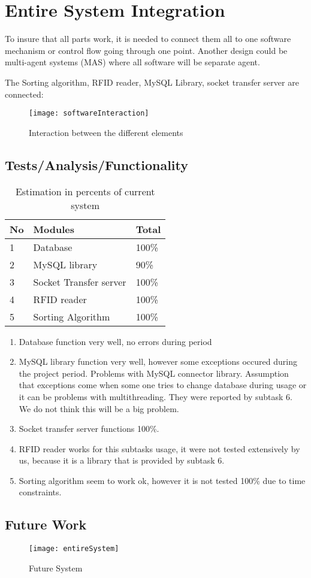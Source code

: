 %
\section{Entire System Integration}

To insure that all parts work, it is needed to connect them all to one software mechanism or control flow going through one point. Another design could be multi-agent systems (MAS) where all software will be separate agent.

The Sorting algorithm, RFID reader, MySQL Library, socket transfer server are connected:

\begin{figure}[h]
	\centering
		\texttt{[image: softwareInteraction]}
	\caption{Interaction between the different elements}
	\label{fig:softwareInteraction}
\end{figure}


\subsection{Tests/Analysis/Functionality}

\begin{table}[h]
	
    \begin{tabular}{ | p{0.5cm} | p{3.8cm} |p{1cm} |}
    \hline
	No & Modules & Total\\ \hline
	1 & Database & 100\% \\ \hline
	2 & MySQL library &  90\% \\ \hline
	3 & Socket Transfer server &  100\% \\ \hline
	4 & RFID reader &  100\% \\ \hline
	5 & Sorting Algorithm &  100\% \\ \hline
    \end{tabular}
	\caption{Estimation in percents of current system}
	\label{tab:percentSystem}
\end{table}

\begin{enumerate}
	\item Database function very well, no errors during period
	\item MySQL library function very well, however some exceptions occured during the project period. Problems with MySQL connector library. Assumption that exceptions come when some one tries to change database during usage or it can be problems with multithreading. They were reported by subtask 6. We do not think this will be a big problem.
	\item Socket transfer server functions 100\%.
	\item RFID reader works for this subtasks usage, it were not tested extensively by us, because it is a library that is provided by subtask 6.
	\item Sorting algorithm seem to work ok, however it is not tested 100\% due to time constraints.
\end{enumerate}

\subsection{Future Work}

\begin{figure}[h]
	\centering
		\texttt{[image: entireSystem]}
	\caption{Future System}
	\label{fig:entireSystem}
\end{figure}